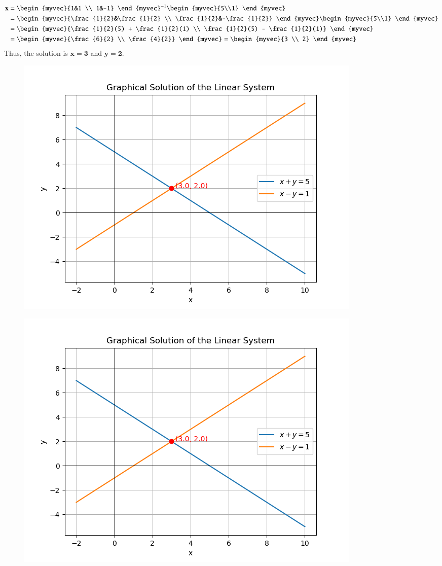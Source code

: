 \documentclass[journal]{IEEEtran}
\begin{document}
	\begin{align}
		\vec{x} &= \begin{myvec}{1&1 \\ 1&-1} \end{myvec}^{-1} \begin{myvec}{5\\1} \end{myvec} \\
		&= \begin{myvec}{\frac{1}{2}&\frac{1}{2} \\ \frac{1}{2}&-\frac{1}{2}} \end{myvec} \begin{myvec}{5\\1} \end{myvec} \\
		&= \begin{myvec}{\frac{1}{2}(5) + \frac{1}{2}(1) \\ \frac{1}{2}(5) - \frac{1}{2}(1)} \end{myvec} \\
		&= \begin{myvec}{\frac{6}{2} \\ \frac{4}{2}} \end{myvec} = \begin{myvec}{3 \\ 2} \end{myvec}
	\end{align}
	Thus, the solution is $\mathbf{x=3}$ and $\mathbf{y=2}$.
	
	
	\begin{figure}[H]
		\centering
		\includegraphics[width = 0.8\columnwidth]{figs/Figure_1.png}
		\caption*{}
		\label{fig1}
	\end{figure}
	\begin{figure}[H]
		\centering
		\includegraphics[width = 0.8\columnwidth]{figs/Figure_2.png}
		\caption*{}
		\label{fig2}
	\end{figure}
	
\end{document}
